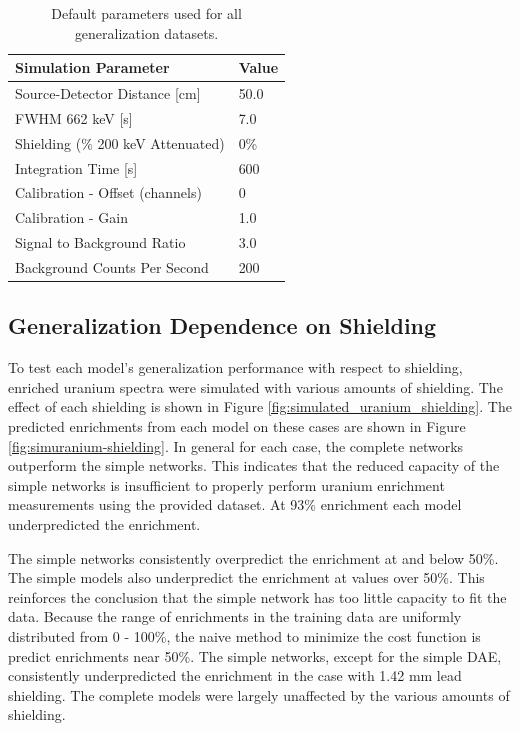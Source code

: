 \begin{table}[H]
\centering
\caption{Default parameters used for all generalization datasets.}
\label{table:default_sim_params_uranium}
\begin{tabular}{ll}
\hline
\textbf{Simulation Parameter} &  \textbf{Value} \\ \hline
Source-Detector Distance [cm] & 50.0\\ 
FWHM 662 keV [s] & 7.0\\
Shielding (\% 200 keV Attenuated) & 0\% \\ 
Integration Time [s] & 600 \\ 
Calibration - Offset (channels) & 0 \\ 
Calibration - Gain & 1.0 \\ 
Signal to Background Ratio & 3.0 \\ 
Background Counts Per Second & 200 \\ \hline
\end{tabular}
\end{table}

\subsection{Generalization Dependence on Shielding}

To test each model's generalization performance with respect to shielding, enriched uranium spectra were simulated with various amounts of shielding. The effect of each shielding is shown in Figure \ref{fig:simulated_uranium_shielding}. The predicted enrichments from each model on these cases are shown in Figure \ref{fig:simuranium-shielding}. In general for each case, the complete networks outperform the simple networks. This indicates that the reduced capacity of the simple networks is insufficient to properly perform uranium enrichment measurements using the provided dataset. At 93\% enrichment each model underpredicted the enrichment.

The simple networks consistently overpredict the enrichment at and below 50\%. The simple models also underpredict the enrichment at values over 50\%. This reinforces the conclusion that the simple network has too little capacity to fit the data. Because the range of enrichments in the training data are uniformly distributed from 0 - 100\%, the naive method to minimize the cost function is predict enrichments near 50\%. The simple networks, except for the simple DAE, consistently underpredicted the enrichment in the case with 1.42 mm lead shielding. The complete models were largely unaffected by the various amounts of shielding.


